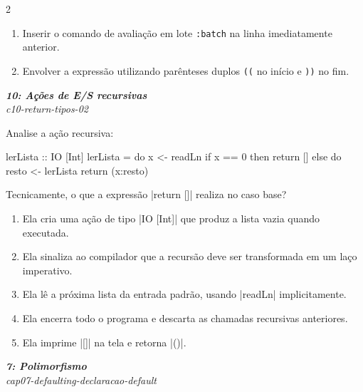 \documentclass[a4paper,10pt,brazil]{article}
\begin{document}
\begin{multicols}{2}
\begin{enumerate}
  \item Inserir o comando de avaliação em lote \texttt{:batch} na linha imediatamente anterior.

  \item Envolver a expressão utilizando parênteses duplos \texttt{((} no início e \texttt{))} no fim.


\end{enumerate}

\begin{flushright}
  \footnotesize
  \textit{\textbf{10: Ações de E/S recursivas}}\\
  \textit{c10-return-tipos-02}\\

\end{flushright}
Analise a ação recursiva:

\begin{haskellcode}
lerLista :: IO [Int]
lerLista = do
  x <- readLn
  if x == 0
    then return []
    else do
      resto <- lerLista
      return (x:resto)
\end{haskellcode}

Tecnicamente, o que a expressão \haskellinline|return []| realiza no caso base?

\begin{enumerate}
  \item Ela cria uma ação de tipo \haskellinline|IO [Int]| que produz a lista vazia quando executada.

  \item Ela sinaliza ao compilador que a recursão deve ser transformada em um laço imperativo.

  \item Ela lê a próxima lista da entrada padrão, usando \haskellinline|readLn| implicitamente.

  \item Ela encerra todo o programa e descarta as chamadas recursivas anteriores.

  \item Ela imprime \haskellinline|[]| na tela e retorna \haskellinline|()|.


\end{enumerate}

\begin{flushright}
  \footnotesize
  \textit{\textbf{7: Polimorfismo}}\\
  \textit{cap07-defaulting-declaracao-default}\\


\end{flushright}
\end{multicols}
\end{document}
